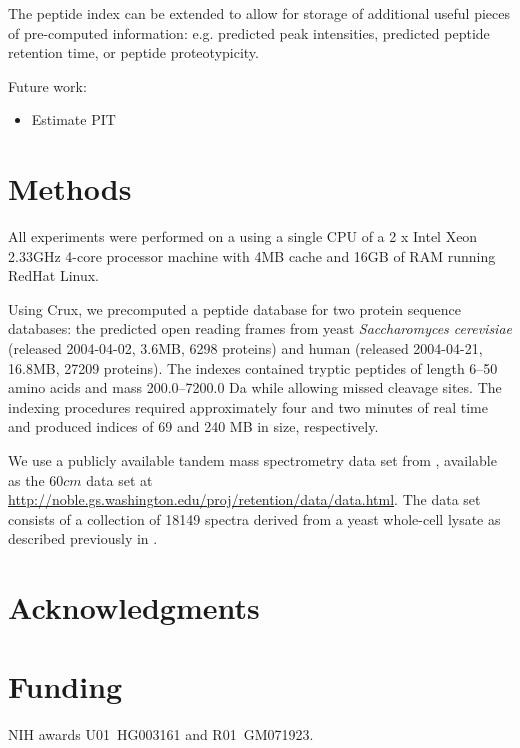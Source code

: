 \documentclass[12pt]{article}
\begin{document}
The peptide index can be extended to allow for
storage of additional useful pieces of pre-computed information: 
e.g.  predicted peak intensities, predicted peptide retention time,
or peptide proteotypicity.  %

Future work:
\begin{itemize}

\item Estimate PIT

\end{itemize}

\section{Methods}

All experiments were performed on a 
using a single CPU of a 2 x Intel Xeon 2.33GHz 4-core processor machine
with 4MB cache and 16GB of RAM running RedHat Linux.

Using Crux, we precomputed a peptide database for two protein sequence databases: the predicted open reading 
frames from yeast {\em Saccharomyces cerevisiae}
(released 2004-04-02, 3.6MB, 6298 proteins) 
and human (released 2004-04-21, 16.8MB, 27209 proteins).
The indexes contained tryptic peptides of
length 6--50 amino acids and mass 200.0--7200.0 Da 
while allowing missed cleavage sites.
The indexing procedures required approximately four and two 
minutes of real time and produced indices of 69 and 240 MB in size, 
respectively.

We use a publicly available tandem mass spectrometry data
set from \cite{klammer:peptide2}, available as the $60cm$ data set at 
\url{http://noble.gs.washington.edu/proj/retention/data/data.html}.
The data set consists of a collection of 18149 spectra derived
from a yeast whole-cell lysate as described previously in 
\cite{klammer:peptide2}.

\section*{Acknowledgments}
\section*{Funding}
NIH awards U01~HG003161 and R01~GM071923.


 
\end{document}
